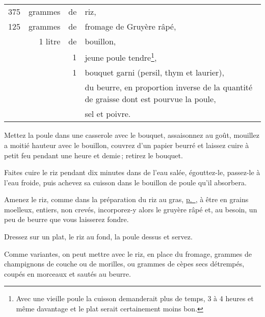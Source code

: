 \footnotesize
\begin{longtable}{rrrp{16em}}
    375 & grammes & de & riz,                                                                             \\
    125 & grammes & de & fromage de Gruyère râpé,                                                         \\
        & 1 litre & de & bouillon,                                                                        \\
        &         &  1 & jeune poule tendre\footnote{Avec une vieille poule la cuisson
                                            demanderait plus de temps, 3 à 4 heures et
                                            même davantage et le plat serait certainement
                                            moins bon.},                                                  \\
        &         &  1 & bouquet garni (persil, thym et laurier),                                         \\
        &         &    & du beurre, en proportion inverse de la quantité
                         de graisse dont est pourvue la poule,                                            \\
        &         &    & sel et poivre.                                                                   \\
\end{longtable}
\normalsize

Mettez la poule dans une casserole avec le bouquet, assaisonnez au goût,
mouillez a moitié hauteur avec le bouillon, couvrez d'un papier beurré et
laissez cuire à petit feu pendant une heure et demie ; retirez le bouquet.

Faites cuire le riz pendant dix minutes dans de l’eau salée, égouttez-le,
passez-le à l'eau froide, puis achevez sa cuisson dans le bouillon de poule
qu'il absorbera.

Amenez le riz, comme dans la préparation du riz au gras,
\hyperlink{p0708}{p. \pageref{pg0708}}, à être en grains moelleux, entiers, non
crevés, incorporez-y alors le gruyère râpé et, au besoin, un peu de beurre que
vous laisserez fondre.

Dressez sur un plat, le riz au fond, la poule dessus et servez.

\sk

Comme variantes, on peut mettre avec le riz, en place du fromage, {\mmm}
grammes de champignons de couche ou de morilles, ou {\mmm} grammes de
cèpes secs détrempés, coupés en morceaux et sautés au beurre.

